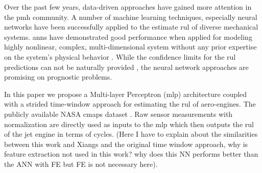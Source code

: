Over the past few years, data-driven approaches have gained more attention in the \gls{pmh} community. A number of machine learning techniques, especially neural networks have been successfully applied to the estimate \gls{rul} of diverse mechanical systems. \glspl{ann} have demonstrated good performance when applied for modeling highly nonlinear, complex, multi-dimensional system without any prior expertise on the system's physical behavior \cite{li_2017}. While the confidence limits for the \gls{rul} predictions can not be naturally provided \cite{sikorska_2011}, the neural network approaches are promising on prognostic problems.

In this paper we propose a Multi-layer Perceptron (\gls{mlp}) architecture coupled with a strided time-window approach for estimating the \gls{rul} of aero-engines. The publicly available NASA \gls{cmaps} dataset \cite{cmaps_2008}. Raw sensor measurements with normalization are directly used as inputs to the \gls{mlp} which then outputs the \gls{rul} of the jet engine in terms of cycles. (Here I have to explain about the similarities between this work and Xiangs and the original time window approach, why is feature extraction not used in this work? why does this NN performs better than the ANN with FE but FE is not necessary here).